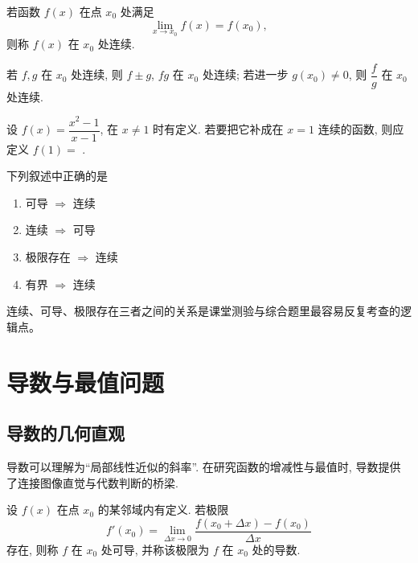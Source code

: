 \documentclass[a4paper,12pt,oneside]{maki-notes}
\begin{document}
\begin{definition}[连续]
若函数 $f(x)$ 在点 $x_0$ 处满足
\[
\lim_{x \to x_0} f(x) = f(x_0),
\]
则称 $f(x)$ 在 $x_0$ 处连续.
\end{definition}

\begin{property}[连续函数的四则运算]
若 $f,g$ 在 $x_0$ 处连续, 则 $f \pm g$, $fg$ 在 $x_0$ 处连续; 若进一步 $g(x_0)\neq 0$, 则 $\dfrac{f}{g}$ 在 $x_0$ 处连续.
\end{property}

\begin{exercise}
设 $f(x)=\dfrac{x^2-1}{x-1}$, 在 $x\neq 1$ 时有定义. 若要把它补成在 $x=1$ 连续的函数, 则应定义 $f(1) = $ \fillin[2.5cm].
\end{exercise}

\begin{exercise}
下列叙述中正确的是\selectbracket
\begin{enumerate}
\item[A.] 可导 $\Longrightarrow$ 连续
\item[B.] 连续 $\Longrightarrow$ 可导
\item[C.] 极限存在 $\Longrightarrow$ 连续
\item[D.] 有界 $\Longrightarrow$ 连续
\end{enumerate}
\end{exercise}

\begin{examfocus}
连续、可导、极限存在三者之间的关系是课堂测验与综合题里最容易反复考查的逻辑点。
\end{examfocus}

\chapter{导数与最值问题}

\section{导数的几何直观}

导数可以理解为“局部线性近似的斜率”. 在研究函数的增减性与最值时, 导数提供了连接图像直觉与代数判断的桥梁.

\begin{definition}[导数]
设 $f(x)$ 在点 $x_0$ 的某邻域内有定义. 若极限
\[
f'(x_0)=\lim_{\Delta x \to 0}\dfrac{f(x_0+\Delta x)-f(x_0)}{\Delta x}
\]
存在, 则称 $f$ 在 $x_0$ 处可导, 并称该极限为 $f$ 在 $x_0$ 处的导数.
\end{definition}
\end{document}
